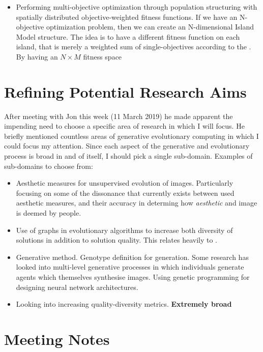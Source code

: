 \documentclass[10pt,a4paper]{article}
\begin{document}
\begin{itemize}
		\item Performing multi-objective optimization through population structuring with spatially distributed objective-weighted fitness functions.
		If we have an N-objective optimization problem, then we can create an N-dimensional Island Model structure.
		The idea is to have a different fitness function on each island, that is merely a weighted sum of single-objectives according to the .
		By having an $N \times M$ fitness space
		
	\end{itemize}
	
	\section{Refining Potential Research Aims}
	
	After meeting with Jon this week (11 March 2019) he made apparent the impending need to choose a specific area of research in which I will focus.
	He briefly mentioned countless areas of generative evolutionary computing in which I could focus my attention.
	Since each aspect of the generative and evolutionary process is broad in and of itself, I should pick a single sub-domain.
	Examples of sub-domains to choose from:
	\begin{itemize}
		\item Aesthetic measures for unsupervised evolution of images.
		Particularly focusing on some of the dissonance that currently exists between used aesthetic measures, and their accuracy in determing how \textit{aesthetic} and image is deemed by people.
		\item Use of graphs in evolutionary algorithms to increase both diversity of solutions in addition to solution quality.
		This relates heavily to \citep{distributed-evolutionary-art}.
		\item Generative method.
		Genotype definition for generation.
		Some research has looked into multi-level generative processes in which individuals generate agents which themselves synthesise images.
		Using genetic programming for designing neural network architectures.
		\item Looking into increasing quality-diversity metrics. \textbf{Extremely broad}
	\end{itemize}
	
	
	\pagebreak
	
	\section{Meeting Notes}
	
\end{document}
